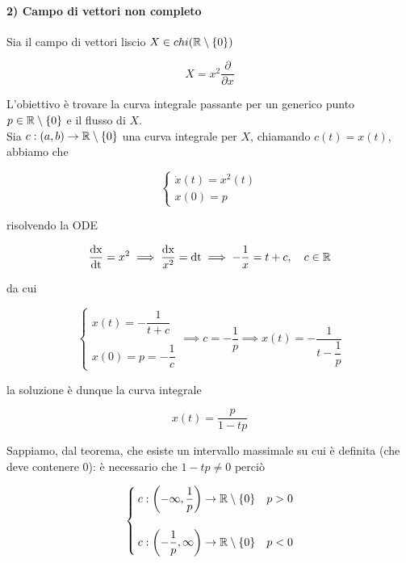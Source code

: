 \paragraph{2) Campo di vettori non completo}

Sia il campo di vettori liscio $ X \in chi(\mathbb{R} \setminus \{0\}) $

\begin{equation}
	X = x^{2} \dfrac{\partial}{\partial x}
\end{equation}

L'obiettivo è trovare la curva integrale passante per un generico punto $ p \in \mathbb{R} \setminus \{0\} $ e il flusso di $ X $.\\
Sia $ c : (a,b) \to \mathbb{R} \setminus \{0\} $ una curva integrale per $ X $, chiamando $ c(t) = x(t) $, abbiamo che

\begin{equation}
	\begin{cases}
		\dot{x}(t) = x^{2}(t)\\
		x(0) = p
	\end{cases}
\end{equation}

risolvendo la ODE

\begin{equation}
	\dfrac{\operatorname{dx}}{\operatorname{dt}} = x^{2} %
	\implies %
	\dfrac{\operatorname{dx}}{x^{2}} = \operatorname{dt} %
	\implies %
	- \dfrac{1}{x} = t + c, \quad c \in \R
\end{equation}

da cui

\begin{equation}
	\begin{cases}
		x(t) = - \dfrac{1}{t + c}\\\\
		x(0) = p = - \dfrac{1}{c}
	\end{cases}%
	\implies %
	c = - \dfrac{1}{p} %
	\implies %
	x(t) = - \dfrac{1}{t - \dfrac{1}{p}}
\end{equation}

la soluzione è dunque la curva integrale

\begin{equation}
	x(t) = \dfrac{p}{1 - t p}
\end{equation}

Sappiamo, dal teorema, che esiste un intervallo massimale su cui è definita (che deve contenere 0): è necessario che $ 1-tp \neq 0 $ perciò

\begin{equation}
	\begin{cases}
		c : \left( -\infty, \dfrac{1}{p} \right) \to \mathbb{R} \setminus \{0\} & p > 0\\\\
		c : \left( -\dfrac{1}{p}, \infty \right) \to \mathbb{R} \setminus \{0\} & p < 0
	\end{cases}
\end{equation}


